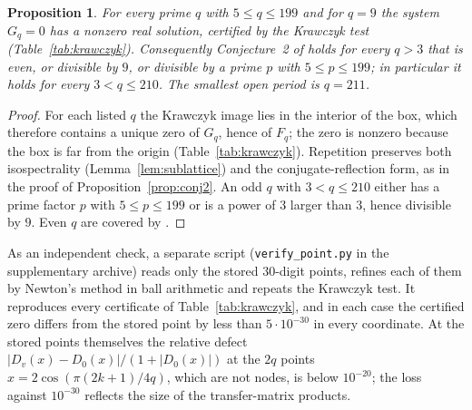 \documentclass[11pt,reqno]{amsart}
\newtheorem{proposition}[theorem]{Proposition}
\theoremstyle{definition}
\theoremstyle{remark}
\begin{document}
\begin{proposition}\label{prop:conj2all}
For every prime $q$ with $5\le q\le 199$ and for $q=9$ the system $G_q=0$ has
a nonzero real solution, certified by the Krawczyk test (Table~\ref{tab:krawczyk}).
Consequently Conjecture~2 of \cite{FFORS2026} holds for every $q>3$ that is
even, or divisible by $9$, or divisible by a prime $p$ with $5\le p\le 199$; in
particular it holds for every $3<q\le 210$.  The smallest open period is $q=211$.
\end{proposition}

\begin{proof}
For each listed $q$ the Krawczyk image lies in the interior of the box, which
therefore contains a unique zero of $G_q$, hence of $F_q$; the zero is nonzero
because the box is far from the origin (Table~\ref{tab:krawczyk}).  Repetition
preserves both isospectrality (Lemma~\ref{lem:sublattice}) and the
conjugate-reflection form, as in the proof of Proposition~\ref{prop:conj2}.
An odd $q$ with $3<q\le 210$ either has a prime factor $p$ with $5\le p\le 199$
or is a power of $3$ larger than $3$, hence divisible by $9$.  Even $q$ are
covered by \cite{FFORS2026}.
\end{proof}

As an independent check, a separate script (\texttt{verify\_point.py} in the
supplementary archive) reads only the stored $30$-digit points, refines each of
them by Newton's method in ball arithmetic and repeats the Krawczyk test.  It
reproduces every certificate of Table~\ref{tab:krawczyk}, and in each case the
certified zero differs from the stored point by less than $5\cdot10^{-30}$ in
every coordinate.  At the stored points themselves the relative defect
$|D_v(x)-D_0(x)|/(1+|D_0(x)|)$ at the $2q$ points $x=2\cos(\pi(2k+1)/4q)$,
which are not nodes, is below $10^{-20}$; the loss against $10^{-30}$
reflects the size of the transfer-matrix products.
\end{document}
